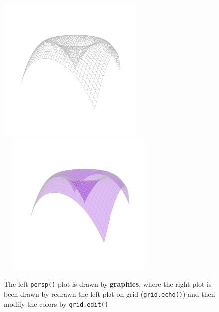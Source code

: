 \documentclass[11pt]{report}
\begin{document}
\begin{figure}[h]
	\begin{center}
		\includegraphics[height = 7cm, width = 7cm]{figure/Chapter6_example_1_2.pdf}
		\includegraphics[height = 7cm, width = 8cm]{figure/Chapter6_example_1_3.pdf}
		\caption{The left \texttt{persp()} plot is drawn by \textbf{graphics}, where the right plot is been drawn by redrawn the left plot on grid (\texttt{grid.echo()}) and then modify the colors by \texttt{grid.edit()}}
		\label{Example_6.3}
	\end{center}
\end{figure}
\end{document}
